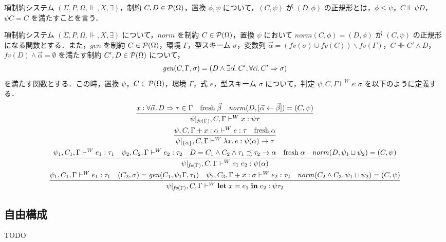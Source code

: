 \begin{definition}[正規形]
  項制約システム $(\Sigma, P, \Omega, \Vdash, X, \exists)$，制約 $C, D \in \mathcal{P}(\Omega)$，置換 $\phi, \psi$ について，$(C, \psi)$ が $(D, \phi)$ の正規形とは，$\phi \leq \psi$，$C \Vdash \psi D$，$\psi C = C$ を満たすことを言う．
\end{definition}

\begin{definition}
  項制約システム $(\Sigma, P, \Omega, \Vdash, X, \exists)$ について，$\mathit{norm}$ を制約 $C \in \mathcal{P}(\Omega)$，置換 $\psi$ において $\mathit{norm}(C, \phi) = (D, \phi)$ が $(C, \psi)$ の正規形になる関数とする．また，$\mathit{gen}$ を制約 $C \in \mathcal{P}(\Omega)$，環境 $\Gamma$，型スキーム $\sigma$，変数列 $\vec{\alpha} = (\mathit{fv}(\sigma) \cup \mathit{fv}(C)) \backslash \mathit{fv}(\Gamma)$，$C \dashVdash C' \land D$，$\mathit{fv}(D) \land \vec{\alpha} = \emptyset$ を満たす制約 $C', D \in \mathcal{P}(\Omega)$ について，
  \begin{align*}
    \mathit{gen}(C, \Gamma, \sigma) = (D \land \exists \vec{\alpha}\ldotp C', \forall \vec{\alpha}\ldotp C' \Rightarrow \sigma)
  \end{align*}
  を満たす関数とする．この時，置換 $\psi$，$C \in \mathcal{P}(\Omega)$，環境 $\Gamma$，式 $e$，型スキーム $\sigma$ について，判定 $\psi, C, \Gamma \vdash^W e: \sigma$ を以下のように定義する．
  \begin{gather*}
    \infer{\psi|_{\mathit{fv}(\Gamma)}, C, \Gamma \vdash^W x: \psi \tau}{
      x: \forall \vec{\alpha}\ldotp D \Rightarrow \tau \in \Gamma
      &
      \mathrm{fresh}\; \vec{\beta}
      &
      \mathit{norm}(D, [\vec{\alpha} \assign \vec{\beta}]) = (C, \psi)
    }
    \\
    \infer{\psi|_{\{\alpha\}}, C, \Gamma \vdash^W \lambda x\ldotp e: \psi(\alpha) \to \tau}{
      \psi, C, \Gamma + x: \alpha \vdash^W e: \tau
      &
      \mathrm{fresh}\; \alpha
    }
    \\
    \infer{\psi|_{\mathit{fv}(\Gamma)}, C, \Gamma \vdash^W e_1\; e_2: \psi(\alpha)}{
      \psi_1, C_1, \Gamma\vdash^W e_1: \tau_1
      &
      \psi_2, C_2, \Gamma\vdash^W e_2: \tau_2
      &
      D = C_1 \land C_2 \land \tau_1 \precsim \tau_2 \to \alpha
      &
      \mathrm{fresh}\; \alpha
      &
      \mathit{norm}(D, \psi_1 \sqcup \psi_2) = (C, \psi)
    }
    \\
    \infer{\psi|_{\mathit{fv}(\Gamma)}, C, \Gamma \vdash^W \mathbf{let}\; x = e_1\; \mathbf{in}\; e_2: \psi\tau_2}{
      \psi_1, C_1, \Gamma\vdash^W e_1: \tau_1
      &
      (C_2, \sigma) = \mathit{gen}(C_1, \psi_1\Gamma, \tau_1)
      &
      \psi_2, C_3, \Gamma + x:\sigma \vdash^W e_2: \tau_2
      &
      \mathit{norm}(C_2 \land C_3, \psi_1 \sqcup \psi_2) = (C, \psi)
    }
  \end{gather*}
\end{definition}

\subsection{自由構成}

TODO
